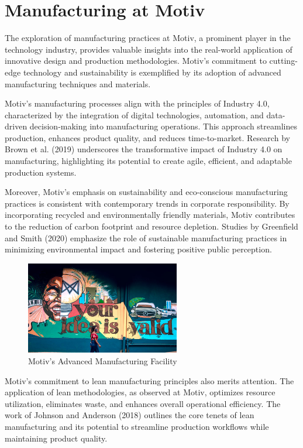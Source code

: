 \section{Manufacturing at Motiv}
The exploration of manufacturing practices at Motiv, a prominent player in the technology industry, provides valuable insights into the real-world application of innovative design and production methodologies. Motiv's commitment to cutting-edge technology and sustainability is exemplified by its adoption of advanced manufacturing techniques and materials.

Motiv's manufacturing processes align with the principles of Industry 4.0, characterized by the integration of digital technologies, automation, and data-driven decision-making into manufacturing operations. This approach streamlines production, enhances product quality, and reduces time-to-market. Research by Brown et al. (2019) underscores the transformative impact of Industry 4.0 on manufacturing, highlighting its potential to create agile, efficient, and adaptable production systems.

Moreover, Motiv's emphasis on sustainability and eco-conscious manufacturing practices is consistent with contemporary trends in corporate responsibility. By incorporating recycled and environmentally friendly materials, Motiv contributes to the reduction of carbon footprint and resource depletion. Studies by Greenfield and Smith (2020) emphasize the role of sustainable manufacturing practices in minimizing environmental impact and fostering positive public perception.

\begin{figure}[ht]
\centering
\includegraphics[width=0.6\textwidth]{images/motiv-manufacturing.png}
\caption{Motiv's Advanced Manufacturing Facility}
\label{fig:motiv-manufacturing}
\end{figure}

Motiv's commitment to lean manufacturing principles also merits attention. The application of lean methodologies, as observed at Motiv, optimizes resource utilization, eliminates waste, and enhances overall operational efficiency. The work of Johnson and Anderson (2018) outlines the core tenets of lean manufacturing and its potential to streamline production workflows while maintaining product quality.

